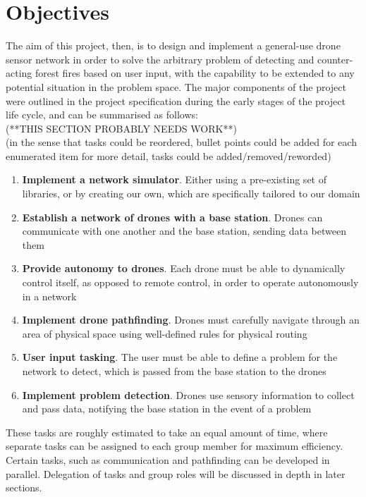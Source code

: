 \documentclass[12pt,a4paper,twoside]{report}
\begin{document}
\section{Objectives}
The aim of this project, then, is to design and implement a general-use drone sensor network in order to solve the arbitrary problem of detecting and counter-acting forest fires based on user input, with the capability to be extended to any potential situation in the problem space. The major components of the project were outlined in the project specification during the early stages of the project life cycle, and can be summarised as follows: \\
(**THIS SECTION PROBABLY NEEDS WORK**) \\
(in the sense that tasks could be reordered, bullet points could be added for each enumerated item for more detail, tasks could be added/removed/reworded)
\begin{enumerate}
  \item \textbf{Implement a network simulator}. Either using a pre-existing set of libraries, or by creating our own, which are specifically tailored to our domain
  \item \textbf{Establish a network of drones with a base station}. Drones can communicate with one another and the base station, sending data between them
  \item \textbf{Provide autonomy to drones}. Each drone must be able to dynamically control itself, as opposed to remote control, in order to operate autonomously in a network
\item \textbf{Implement drone pathfinding}. Drones must carefully navigate through an area of physical space using well-defined rules for physical routing
\item \textbf{User input tasking}. The user must be able to define a problem for the network to detect, which is passed from the base station to the drones
\item \textbf{Implement problem detection}. Drones use sensory information to collect and pass data, notifying the base station in the event of a problem
\end{enumerate}
These tasks are roughly estimated to take an equal amount of time, where separate tasks can be assigned to each group member for maximum efficiency. Certain tasks, such as communication and pathfinding can be developed in parallel. Delegation of tasks and group roles will be discussed in depth in later sections.
\end{document}
